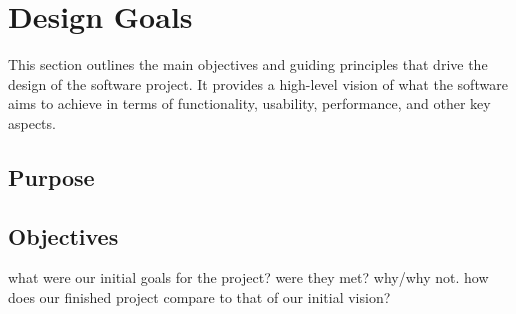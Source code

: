 \section{Design Goals}

This section outlines the main objectives and guiding principles that drive the design of the software project. 
It provides a high-level vision of what the software aims to achieve in terms of functionality, usability, performance, and other key aspects.

\subsection{Purpose}

\subsection{Objectives}
what were our initial goals for the project? were they met? why/why not. how does our finished project compare to that of our initial vision?
